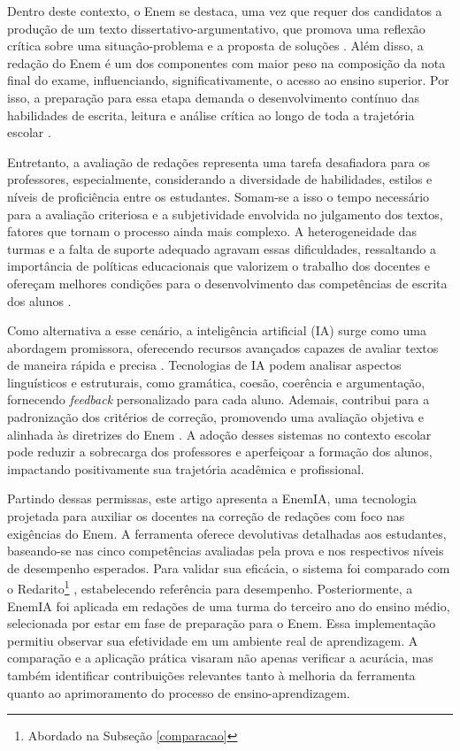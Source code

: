 \documentclass[portuguese]{textolivre}
\begin{document}
Dentro deste contexto, o Enem se destaca, uma vez que requer dos candidatos a produção de um texto dissertativo-argumentativo, que promova uma reflexão crítica sobre uma situação-problema e a proposta de soluções \cite{coqueiro2025autoria}. Além disso, a redação do Enem é um dos componentes com maior peso na composição da nota final do exame, influenciando, significativamente, o acesso ao ensino superior. Por isso, a preparação para essa etapa demanda o desenvolvimento contínuo das habilidades de escrita, leitura e análise crítica ao longo de toda a trajetória escolar \cite{prado2017redacao}.

Entretanto, a avaliação de redações representa uma tarefa desafiadora para os professores, especialmente, considerando a diversidade de habilidades, estilos e níveis de proficiência entre os estudantes. Somam-se a isso o tempo necessário para a avaliação criteriosa e a subjetividade envolvida no julgamento dos textos, fatores que tornam o processo ainda mais complexo. A heterogeneidade das turmas e a falta de suporte adequado agravam essas dificuldades, ressaltando a importância de políticas educacionais que valorizem o trabalho dos docentes e ofereçam melhores condições para o desenvolvimento das competências de escrita dos alunos \cite{correia2020generos}.


Como alternativa a esse cenário, a inteligência artificial (IA) surge como uma abordagem promissora, oferecendo recursos avançados capazes de avaliar textos de maneira rápida e precisa \cite{guimaraes2022ia}. Tecnologias de IA podem analisar aspectos linguísticos e estruturais, como gramática, coesão, coerência e argumentação, fornecendo \textit{feedback} personalizado para cada aluno. Ademais, contribui para a padronização dos critérios de correção, promovendo uma avaliação objetiva e alinhada às diretrizes do Enem \cite{pinho2024ia}. A adoção desses sistemas no contexto escolar pode reduzir a sobrecarga dos professores e aperfeiçoar a formação dos alunos, impactando positivamente sua trajetória acadêmica e profissional.

Partindo dessas permissas, este artigo apresenta a EnemIA, uma tecnologia projetada para auxiliar os docentes na correção de redações com foco nas exigências do Enem. A ferramenta oferece devolutivas detalhadas aos estudantes, baseando-se nas cinco competências avaliadas pela prova e nos respectivos níveis de desempenho esperados. Para validar sua eficácia, o sistema foi comparado com o Redarito\footnote{Abordado na Subseção \ref{comparacao}} \cite{redarito}, estabelecendo referência para desempenho. Posteriormente, a EnemIA foi aplicada em redações de uma turma do terceiro ano do ensino médio, selecionada por estar em fase de preparação para o Enem. Essa implementação permitiu observar sua efetividade em um ambiente real de aprendizagem. A comparação e a aplicação prática visaram não apenas verificar a acurácia, mas também identificar contribuições relevantes tanto à melhoria da ferramenta quanto ao aprimoramento do processo de ensino-aprendizagem.
\end{document}
